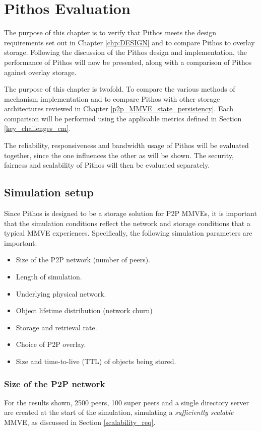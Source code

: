 \chapter{Pithos Evaluation}
\label{chp:EVALUATION}

The purpose of this chapter is to verify that Pithos meets the design requirements set out in Chapter \ref{chp:DESIGN} and to compare Pithos to overlay storage. Following the discussion of the Pithos design and implementation, the performance of Pithos will now be presented, along with a comparison of Pithos against overlay storage.

The purpose of this chapter is twofold. To compare the various methods of mechanism implementation and to compare Pithos with other storage architectures reviewed in Chapter \ref{p2p_MMVE_state_persistency}. Each comparison will be performed using the applicable metrics defined in Section \ref{key_challenges_cm}.

The reliability, responsiveness and bandwidth usage of Pithos will be evaluated together, since the one influences the other as will be shown. The security, fairness and scalability of Pithos will then be evaluated separately.

\section{Simulation setup}
\label{simulation_setup}

Since Pithos is designed to be a storage solution for P2P MMVEs, it is important that the simulation conditions reflect the network and storage conditions that a typical MMVE experiences. Specifically, the following simulation parameters are important:
%
\begin{itemize}
\item Size of the P2P network (number of peers).
\item Length of simulation.
\item Underlying physical network.
\item Object lifetime distribution (network churn)
\item Storage and retrieval rate.
\item Choice of P2P overlay.
\item Size and time-to-live (TTL) of objects being stored.
\end{itemize}

\subsection{Size of the P2P network}
For the results shown, 2500 peers, 100 super peers and a single directory server are created at the start of the simulation, simulating a \emph{sufficiently scalable} MMVE, as discussed in Section \ref{scalability_req}.

